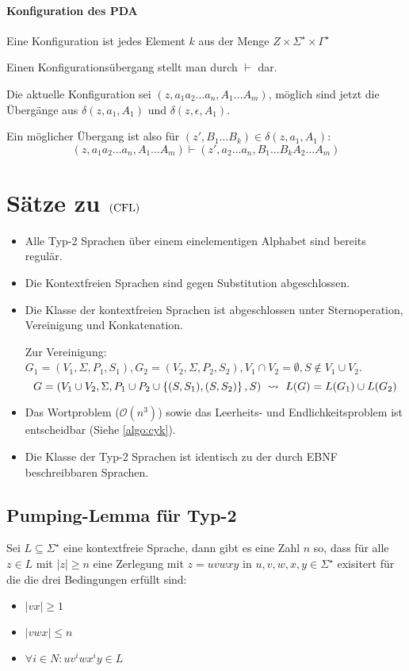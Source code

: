 \paragraph{Konfiguration des PDA}
Eine Konfiguration ist jedes Element $k$ aus der Menge $Z\times\Sigma^\star\times\Gamma^\star$

Einen Konfigurationsübergang stellt man durch $\vdash$ dar.

Die aktuelle Konfiguration sei $(z,a_1a_2\ldots a_n,A_1\ldots A_m)$, möglich sind jetzt die Übergänge aus $\delta(z,a_1,A_1)$ und $\delta(z,\epsilon,A_1)$.

Ein möglicher Übergang ist also für $(z',B_1\ldots B_k)\in\delta(z,a_1,A_1)$:
\begin{equation*}
	(z,a_1a_2\ldots a_n,A_1\ldots A_m)\vdash (z',a_2\ldots a_n,B_1\ldots B_kA_2\ldots A_m)
\end{equation*}



\section{Sätze zu $\mathrm{(CFL)}$}
\begin{itemize}
	\item Alle Typ-2 Sprachen über einem einelementigen Alphabet sind bereits regulär.
	\item Die Kontextfreien Sprachen sind gegen Substitution abgeschlossen.
	\item Die Klasse der kontextfreien Sprachen ist abgeschlossen unter Sternoperation, Vereinigung und Konkatenation.

	Zur Vereinigung: $G_1=(V_1,\Sigma, P_1,S_1), G_2=(V_2,\Sigma, P_2,S_2), V_1\cap V_2=\emptyset, S\not\in V_1\cup V_2$.
	\begin{equation*}
		G=(V_1\cup V_2, \Sigma, P_1\cup P_2\cup\simpleset{(S,S_1),(S,S_2)},S) \ \rightsquigarrow\  L(G)=L(G_1)\cup L(G_2)
	\end{equation*}
	\item Das Wortproblem ($\mathcal O(n^3)$) sowie das Leerheits- und Endlichkeitsproblem ist entscheidbar (Siehe \autoref{algo:cyk}).
	\item Die Klasse der Typ-2 Sprachen ist identisch zu der durch EBNF beschreibbaren Sprachen.
\end{itemize}
\subsection{Pumping-Lemma für Typ-2}
Sei $L\subseteq \Sigma^\star$ eine kontextfreie Sprache, dann gibt es eine Zahl $n$ so, dass für alle $z\in L$ mit $|z|\geq n$ eine Zerlegung mit $z=uvwxy$ in $u,v,w,x,y\in\Sigma^\star$ exisitert für die die drei Bedingungen erfüllt sind:
\begin{itemize}
	\item $|vx|\geq 1$
	\item $|vwx|\leq n$
	\item $\forall i\in N: uv^iwx^iy\in L$
\end{itemize}


